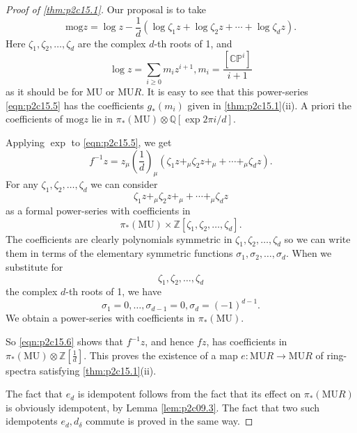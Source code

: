 \documentclass[../main]{subfiles}
\begin{document}
\begin{proof}[Proof of \eqref{thm:p2c15.1}]
Our proposal is to take
\begin{equation}
\label{eqn:p2c15.5}
\tag{15.5}
\mathrm{mog}z=\log z -\frac1d(\log\zeta_1z+\log\zeta_2z+\cdots+\log\zeta_dz).
\end{equation}
Here $\zeta_1,\zeta_2,\dots,\zeta_d$ are the complex $d$-th roots of 1, and $$\log z=\sum_{i\geq0}m_iz^{i+1},m_i=\frac{[\mathbb{CP}^i]}{i+1}$$ as it should be for $\mathrm{MU}$ or $\mathrm{MU}R$. It is easy to see that this power-series \eqref{eqn:p2c15.5} has the coefficients $g_\ast(m_i)$ given in \eqref{thm:p2c15.1}(ii). A priori the coefficients of $\mathrm{mog}z$ lie in $\pi_\ast(\mathrm{MU})\otimes\mathbb{Q}[\exp2\pi i/d]$.

Applying $\exp$ to \eqref{eqn:p2c15.5}, we get 
\begin{equation}
\label{eqn:p2c15.6}
\tag{15.6}
f^{-1}z=z_\mu\left(\frac1d\right)_\mu(\zeta_1z+_\mu\zeta_2z+_\mu+\cdots+_\mu\zeta_dz).
\end{equation}
For any $\zeta_1,\zeta_2,\dots,\zeta_d$ we can consider $$\zeta_1z+_\mu\zeta_2z+_\mu+\cdots+_\mu\zeta_dz$$ as a formal power-series with coefficients in $$\pi_\ast(\mathrm{MU})\times\mathbb{Z}[\zeta_1,\zeta_2,\dots,\zeta_d].$$ The coefficients are clearly polynomials symmetric in $\zeta_1, \zeta_2,\dots,\zeta_d$ so we can write them in terms of the elementary symmetric functions $\sigma_1,\sigma_2,\dots,\sigma_d$. When we substitute for $$\zeta_1,\zeta_2,\dots,\zeta_d$$ the complex $d$-th roots of 1, we have $$\sigma_1=0,\dots,\sigma_{d-1}=0,\sigma_d=(-1)^{d-1}.$$ We obtain a power-series with coefficients in $\pi_\ast(\mathrm{MU})$.

So \eqref{eqn:p2c15.6} shows that $f^{-1}z$, and hence $fz$, has coefficients in $\pi_\ast(\mathrm{MU})\otimes\mathbb{Z}\left[\frac1d\right]$. This proves the existence of a map $e:\mathrm{MU}R\longrightarrow\mathrm{MU}R$ of ring-spectra satisfying \eqref{thm:p2c15.1}(ii).

The fact that $e_d$ is idempotent follows from the fact that its effect on $\pi_\ast(\mathrm{MU}R)$ is obviously idempotent, by Lemma \ref{lem:p2c09.3}. The fact that two such idempotents $e_d,d_\delta$ commute is proved in the same way. 
\end{proof}
\end{document}
